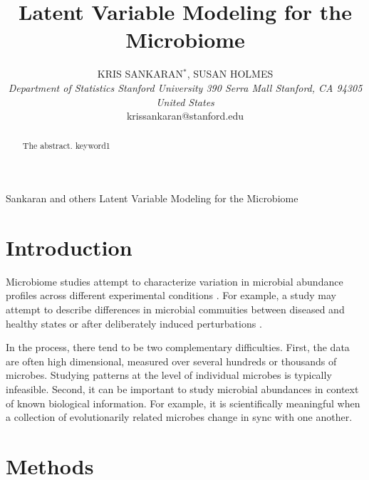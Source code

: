 \documentclass[oupdraft]{bio}
\begin{document}
\title{Latent Variable Modeling for the Microbiome} 

\author{
  KRIS SANKARAN$^\ast$, SUSAN HOLMES\\[4pt]
  \textit{
    Department of Statistics
    Stanford University
    390 Serra Mall
    Stanford, CA 94305
    United States
  } \\[2pt]
  {krissankaran@stanford.edu}
}

\markboth
{Sankaran and others}
{Latent Variable Modeling for the Microbiome}

\maketitle


\begin{abstract}
  {
    The abstract.
  }
  {
    keyword1
  }
\end{abstract}

\section{Introduction}

Microbiome studies attempt to characterize variation in microbial
abundance profiles across different experimental conditions
\cite{human2012structure}. For example, a study may attempt to describe differences
in microbial commuities between diseased and healthy states or after
deliberately induced perturbations \cite{dethlefsen2011incomplete}.

In the process, there tend to be two complementary difficulties. First, the data
are often high dimensional, measured over several hundreds or thousands of
microbes. Studying patterns at the level of individual microbes is typically
infeasible. Second, it can be important to study microbial abundances in context
of known biological information. For example, it is scientifically meaningful
when a collection of evolutionarily related microbes change in sync with one
another.

\section{Methods}
\end{document}
